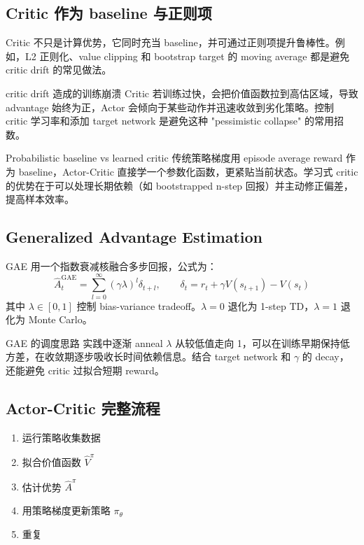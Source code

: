 \documentclass[a4paper]{article}
\begin{document}
\subsection{Critic 作为 baseline 与正则项}

Critic 不只是计算优势，它同时充当 baseline，并可通过正则项提升鲁棒性。例如，L2 正则化、value clipping 和 bootstrap target 的 moving average 都是避免 critic drift 的常见做法。

\begin{warningbox}{critic drift 造成的训练崩溃}
Critic 若训练过快，会把价值函数拉到高估区域，导致 advantage 始终为正，Actor 会倾向于某些动作并迅速收敛到劣化策略。控制 critic 学习率和添加 target network 是避免这种 "pessimistic collapse" 的常用招数。
\end{warningbox}

\begin{knowledgebox}{Probabilistic baseline vs learned critic}
传统策略梯度用 episode average reward 作为 baseline，Actor-Critic 直接学一个参数化函数，更紧贴当前状态。学习式 critic 的优势在于可以处理长期依赖（如 bootstrapped n-step 回报）并主动修正偏差，提高样本效率。
\end{knowledgebox}

\subsection{Generalized Advantage Estimation}

GAE 用一个指数衰减核融合多步回报，公式为：
$$\hat{A}^\text{GAE}_{t} = \sum_{l=0}^{\infty} (\gamma \lambda)^l \delta_{t+l}, \qquad \delta_t = r_t + \gamma V(s_{t+1}) - V(s_t)$$
其中 $\lambda \in [0,1]$ 控制 bias-variance tradeoff。$\lambda=0$ 退化为 1-step TD，$\lambda=1$ 退化为 Monte Carlo。

\begin{importantbox}{GAE 的调度思路}
实践中逐渐 anneal $\lambda$ 从较低值走向 1，可以在训练早期保持低方差，在收敛期逐步吸收长时间依赖信息。结合 target network 和 $\gamma$ 的 decay，还能避免 critic 过拟合短期 reward。
\end{importantbox}

\subsection{Actor-Critic 完整流程}

\begin{enumerate}
    \item 运行策略收集数据
    \item 拟合价值函数 $\hat{V}^\pi$
    \item 估计优势 $\hat{A}^\pi$
    \item 用策略梯度更新策略 $\pi_\theta$
    \item 重复
\end{enumerate}
\end{document}

